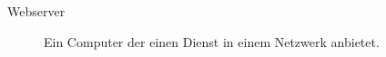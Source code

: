 \chapter*{\nameofglossary}

\begin{description}
	\item[Webserver] Ein Computer der einen Dienst in einem Netzwerk anbietet.
\end{description}
